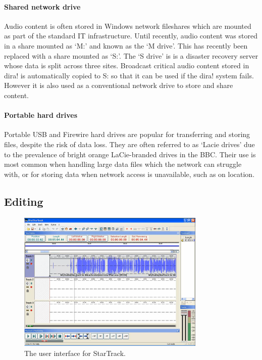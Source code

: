 \paragraph{Shared network drive}
Audio content is often stored in Windows network fileshares which are mounted
as part of the standard IT infrastructure. Until recently, audio content was
stored in a share mounted as `M:' and known as the `M drive'. This has recently
been replaced with a share mounted as `S:'. The `S drive' is is a disaster
recovery server whose data is split across three sites. Broadcast critical
audio content stored in dira! is automatically copied to S: so that it can be
used if the dira! system fails. However it is also used as a conventional
network drive to store and share content.

\paragraph{Portable hard drives}
Portable USB and Firewire hard drives are popular for transferring and storing
files, despite the risk of data loss. They are often referred to as `Lacie
drives' due to the prevalence of bright orange LaCie-branded drives in the BBC.
Their use is most common when handling large data files which the network can
struggle with, or for storing data when network access is unavailable, such as
on location.

\subsection{Editing}

\begin{figure}[p]
\centering
\includegraphics[width=0.8\textwidth]{figs/startrack.png}
\caption{The user interface for StarTrack.}
\label{fig:startrack}
\end{figure}

